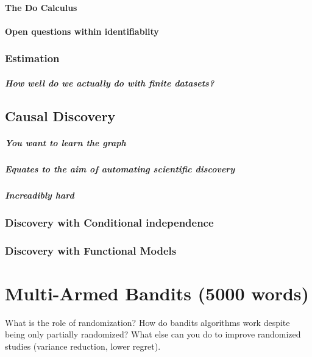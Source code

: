 \documentclass[11pt,a4paper]{book}
\begin{document}
\subsubsection*{The Do Calculus}

\subsubsection*{Open questions within identifiablity}

\subsection*{Estimation}
\paragraph*{How well do we actually do with finite datasets?}


\section*{Causal Discovery}
\paragraph*{You want to learn the graph}
\paragraph*{Equates to the aim of automating scientific discovery}
\paragraph*{Increadibly hard}
\subsection*{Discovery with Conditional independence}
\subsection*{Discovery with Functional Models}

\chapter*{Multi-Armed Bandits (5000 words)}

What is the role of randomization? How do bandits algorithms work despite being only partially randomized? 
What else can you do to improve randomized studies (variance reduction, lower regret).
\end{document}
